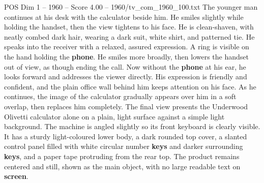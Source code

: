 \begin{textsample}{POS Dim 1 – 1960 – Score 4.00 – 1960/tv\_com\_1960\_100.txt}
The younger man continues at his desk with the calculator beside him.
He smiles slightly while holding the handset, then the view tightens to his face.
He is clean-shaven, with neatly combed dark hair, wearing a dark suit, white shirt, and patterned tie.
He speaks into the receiver with a relaxed, assured expression.
A ring is visible on the hand holding the \textbf{phone}.
He smiles more broadly, then lowers the handset out of view, as though ending the call.
Now without the \textbf{phone} at his ear, he looks forward and addresses the viewer directly.
His expression is friendly and confident, and the plain office wall behind him keeps attention on his face.
As he continues, the image of the calculator gradually appears over him in a soft overlap, then replaces him completely.
The final view presents the Underwood Olivetti calculator alone on a plain, light surface against a simple light background.
The machine is angled slightly so its front keyboard is clearly visible.
It has a sturdy light-coloured lower body, a dark rounded top cover, a slanted control panel filled with white circular number \textbf{keys} and darker surrounding \textbf{keys}, and a paper tape protruding from the rear top.
The product remains centered and still, shown as the main object, with no large readable text on \textbf{screen}.

\end{textsample}

